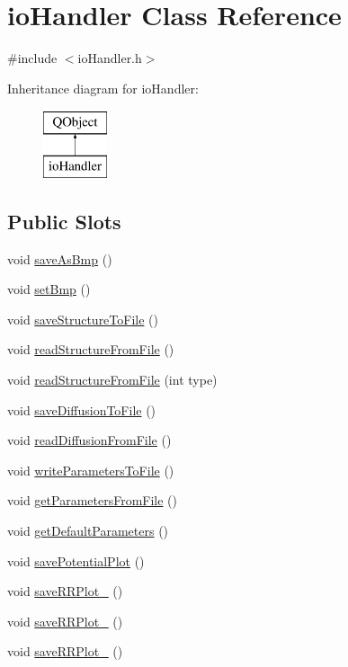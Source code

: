 \hypertarget{classio_handler}{\section{io\+Handler Class Reference}
\label{classio_handler}
}


{\ttfamily \#include $<$io\+Handler.\+h$>$}

Inheritance diagram for io\+Handler\+:\begin{figure}[H]
\begin{center}
\leavevmode
\includegraphics[height=2.000000cm]{classio_handler}
\end{center}
\end{figure}
\subsection*{Public Slots}
\begin{DoxyCompactItemize}
\item 
void \hyperlink{classio_handler_a472e8932c9769f3a577d11ea7c0e224d}{save\+As\+Bmp} ()
\item 
void \hyperlink{classio_handler_a8b295df2cd4f85f178935c310f6dad34}{set\+Bmp} ()
\item 
void \hyperlink{classio_handler_a91de29843e2894a8b778de65a557562a}{save\+Structure\+To\+File} ()
\item 
void \hyperlink{classio_handler_a436429bf34fe5f838137ffd536e6859b}{read\+Structure\+From\+File} ()
\item 
void \hyperlink{classio_handler_a8e799f96c1e1056d5c59f621945a64c6}{read\+Structure\+From\+File} (int type)
\item 
void \hyperlink{classio_handler_a8e39ebabd54b939c91b8d70bc7234e8c}{save\+Diffusion\+To\+File} ()
\item 
void \hyperlink{classio_handler_ab23bb54a388784e6397575fdb5e1a836}{read\+Diffusion\+From\+File} ()
\item 
void \hyperlink{classio_handler_a0549d597c8da9195fd764044cb4c5a63}{write\+Parameters\+To\+File} ()
\item 
void \hyperlink{classio_handler_a32fc5c3861951f75c7ffbf62ed44e3e3}{get\+Parameters\+From\+File} ()
\item 
void \hyperlink{classio_handler_ac9eac90b6bdc44e46d3802e884034abe}{get\+Default\+Parameters} ()
\item 
void \hyperlink{classio_handler_a3ce2a07edc23ff12d084e64b85416954}{save\+Potential\+Plot} ()
\item 
void \hyperlink{classio_handler_aa05a5e6a55ac70333479724c48d09a42}{save\+R\+R\+Plot\+\_} ()
\item 
void \hyperlink{classio_handler_aee153e33abd373472c856467563d4c7d}{save\+R\+R\+Plot\+\_} ()
\item 
void \hyperlink{classio_handler_a2de36fdfa99f28b20c6fe1b2069b75ad}{save\+R\+R\+Plot\+\_} ()
\end{DoxyCompactItemize}
